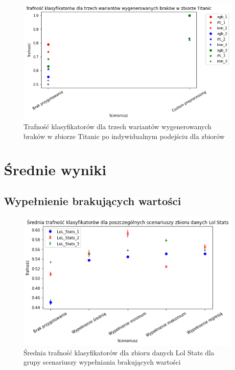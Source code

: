 \documentclass{book}
\begin{document}
\begin{figure}[H]
    \centerline{\includegraphics[scale=0.8]{Titanic_Custom}}
    \centering
    \caption{Trafność klasyfikatorów dla trzech wariantów wygenerowanych braków w zbiorze Titanic po indywidualnym podejściu dla zbiorów}
    \end{figure}


\section{Średnie wyniki}

\subsection{Wypełnienie brakujących wartości}

\begin{figure}[H]
    \centerline{\includegraphics[scale=0.8]{Lol_Stats_Avg_Wypełnienie_brakujących}}
    \centering
    \caption{Średnia trafność klasyfikatorów dla zbioru danych Lol Stats 
    dla grupy scenariuszy wypełniania brakujących wartości}
    \end{figure}
\end{document}
